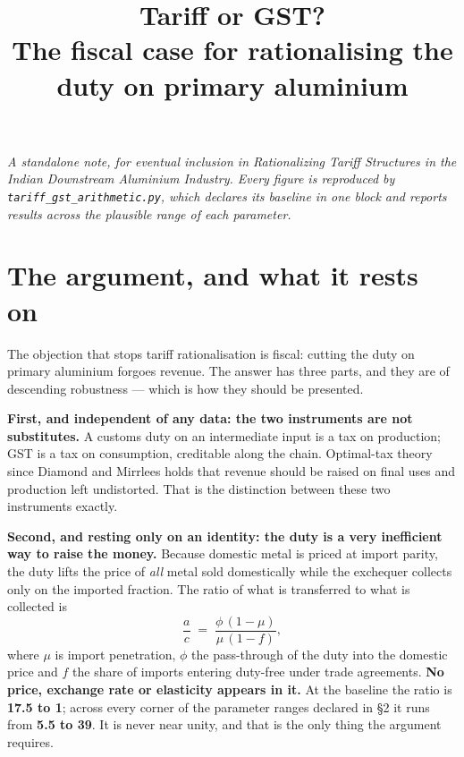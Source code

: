 \documentclass[11pt, a4paper]{article}
\title{\textbf{Tariff or GST?}\\
\large The fiscal case for rationalising the duty on primary aluminium}
\author{}
\date{}
\begin{document}
\maketitle
\vspace{-1.0cm}

\begin{center}
\small\itshape A standalone note, for eventual inclusion in
\textit{Rationalizing Tariff Structures in the Indian Downstream Aluminium
Industry}. Every figure is reproduced by \texttt{tariff\_gst\_arithmetic.py},
which declares its baseline in one block and reports results across the
plausible range of each parameter.
\end{center}

\vspace{0.3cm}

\section{The argument, and what it rests on}

The objection that stops tariff rationalisation is fiscal: cutting the duty on
primary aluminium forgoes revenue. The answer has three parts, and they are of
descending robustness --- which is how they should be presented.

\textbf{First, and independent of any data: the two instruments are not
substitutes.} A customs duty on an intermediate input is a tax on production; GST is
a tax on consumption, creditable along the chain. Optimal-tax theory since Diamond
and Mirrlees holds that revenue should be raised on final uses and production left
undistorted. That is the distinction between these two instruments exactly.

\textbf{Second, and resting only on an identity: the duty is a very inefficient way
to raise the money.} Because domestic metal is priced at import parity, the duty
lifts the price of \emph{all} metal sold domestically while the exchequer collects
only on the imported fraction. The ratio of what is transferred to what is collected
is
\[
\frac{a}{c} \;=\; \frac{\phi\,(1-\mu)}{\mu\,(1-f)},
\]
where $\mu$ is import penetration, $\phi$ the pass-through of the duty into the
domestic price and $f$ the share of imports entering duty-free under trade
agreements. \textbf{No price, exchange rate or elasticity appears in it.} At the
baseline the ratio is \textbf{17.5 to 1}; across every corner of the parameter
ranges declared in §2 it runs from \textbf{5.5 to 39}. It is never near unity, and
that is the only thing the argument requires.
\end{document}
